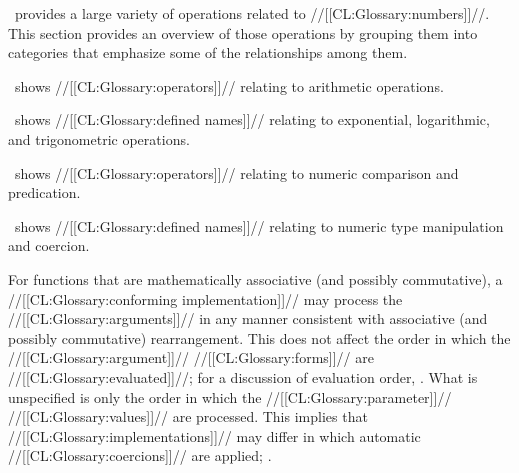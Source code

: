 

 

\clisp\ provides a large variety of operations related to //[[CL:Glossary:numbers]]//. This section provides an overview of those operations by grouping them into categories that emphasize some of the relationships among them.

\Thenextfigure\ shows //[[CL:Glossary:operators]]// relating to arithmetic operations.


\Thenextfigure\ shows //[[CL:Glossary:defined names]]// relating to exponential, logarithmic, and trigonometric operations.


\Thenextfigure\ shows //[[CL:Glossary:operators]]// relating to numeric comparison and predication.


\Thenextfigure\ shows //[[CL:Glossary:defined names]]// relating to numeric type manipulation and coercion.



For functions that are mathematically associative (and possibly commutative), a //[[CL:Glossary:conforming implementation]]// may process the //[[CL:Glossary:arguments]]// in any manner  consistent with associative (and possibly commutative) rearrangement.  This does not affect the order in which the //[[CL:Glossary:argument]]// //[[CL:Glossary:forms]]// are //[[CL:Glossary:evaluated]]//; for a discussion of evaluation order, \seesection\FunctionForms. What is unspecified is only the order in which the //[[CL:Glossary:parameter]]// //[[CL:Glossary:values]]// are processed.  This implies that //[[CL:Glossary:implementations]]// may differ in which  automatic //[[CL:Glossary:coercions]]// are applied; \seesection\NumericContagionRules.

